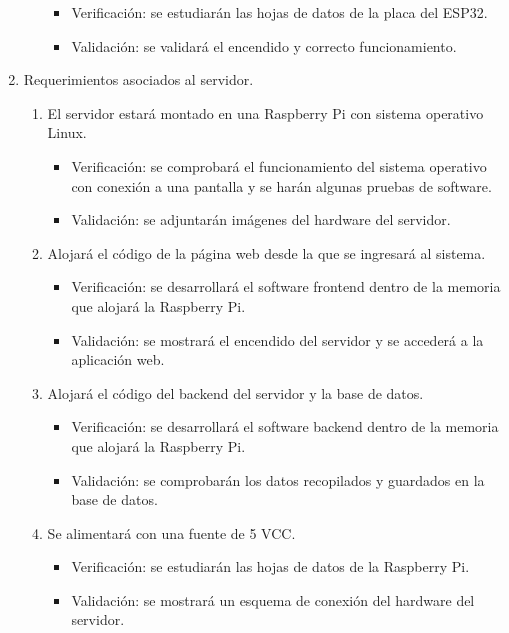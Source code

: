 \documentclass[
11pt, %
]{charter}
\begin{document}
\begin{enumerate}
\begin{enumerate}
			\begin{itemize}
				\item Verificación: se estudiarán las hojas de datos de la placa del ESP32.
				\item Validación: se validará el encendido y correcto funcionamiento.
			\end{itemize}
		\end{enumerate}
	\item Requerimientos asociados al servidor.
		\begin{enumerate}
			\item El servidor estará montado en una Raspberry Pi con sistema operativo Linux.
			\begin{itemize}
				\item Verificación: se comprobará el funcionamiento del sistema operativo con conexión a una pantalla y se harán algunas pruebas de software.
				\item Validación: se adjuntarán imágenes del hardware del servidor.
			\end{itemize}
			\item Alojará el código de la página web desde la que se ingresará al sistema.
			\begin{itemize}
				\item Verificación: se desarrollará el software frontend dentro de la memoria que alojará la Raspberry Pi.
				\item Validación: se mostrará el encendido del servidor y se accederá a la aplicación web.
			\end{itemize}
			\item Alojará el código del backend del servidor y la base de datos.
			\begin{itemize}
				\item Verificación: se desarrollará el software backend dentro de la memoria que alojará la Raspberry Pi.
				\item Validación: se comprobarán los datos recopilados y guardados en la base de datos.
			\end{itemize}
			\item Se alimentará con una fuente de 5 VCC.
			\begin{itemize}
				\item Verificación: se estudiarán las hojas de datos de la Raspberry Pi.
				\item Validación: se mostrará un esquema de conexión del hardware del servidor.
			\end{itemize}
		\end{enumerate}

\end{enumerate}
\end{document}
